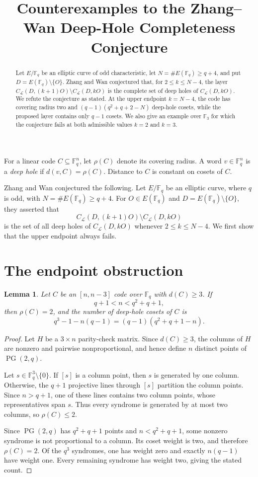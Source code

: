 \documentclass[11pt]{amsart}
\title[Counterexamples to the Zhang--Wan conjecture]
{Counterexamples to the Zhang--Wan Deep-Hole Completeness Conjecture}
\date{}
\newtheorem{lemma}[theorem]{Lemma}
\newcommand{\F}{\mathbb{F}}
\newcommand{\CL}{C_{\mathcal L}}
\newcommand{\PG}{\operatorname{PG}}
\begin{document}
\begin{abstract}
Let $E/\F_q$ be an elliptic curve of odd characteristic, let
$N=\#E(\F_q)\ge q+4$, and put $D=E(\F_q)\setminus\{O\}$.
Zhang and Wan conjectured that, for $2\le k\le N-4$, the layer
$\CL(D,(k+1)O)\setminus\CL(D,kO)$ is the complete set of deep holes of
$\CL(D,kO)$. We refute the conjecture as stated. At the upper endpoint
$k=N-4$, the code has covering radius two and
$(q-1)(q^2+q+2-N)$ deep-hole cosets, while the proposed layer contains
only $q-1$ cosets. We also give an example over $\F_3$ for which the
conjecture fails at both admissible values $k=2$ and $k=3$.
\end{abstract}

\maketitle

For a linear code $C\subseteq\F_q^n$, let $\rho(C)$ denote its covering
radius. A word $v\in\F_q^n$ is a \emph{deep hole} if
$d(v,C)=\rho(C)$. Distance to $C$ is constant on cosets of $C$.

Zhang and Wan \cite[Conjecture~1.4]{ZhangWan} conjectured the following.
Let $E/\F_q$ be an elliptic curve, where $q$ is odd, with
$N=\#E(\F_q)\ge q+4$. For $O\in E(\F_q)$ and
$D=E(\F_q)\setminus\{O\}$, they asserted that
\begin{equation}\label{eq:ZW}
  \CL(D,(k+1)O)\setminus\CL(D,kO)
\end{equation}
is the set of all deep holes of $\CL(D,kO)$ whenever
$2\le k\le N-4$. We first show that the upper endpoint always fails.

\section{The endpoint obstruction}

\begin{lemma}\label{lem:codim-three}
Let $C$ be an $[n,n-3]$ code over $\F_q$ with $d(C)\ge3$. If
\[
  q+1<n<q^2+q+1,
\]
then $\rho(C)=2$, and the number of deep-hole cosets of $C$ is
\[
  q^3-1-n(q-1)=(q-1)(q^2+q+1-n).
\]
\end{lemma}

\begin{proof}
Let $H$ be a $3\times n$ parity-check matrix. Since $d(C)\ge3$, the
columns of $H$ are nonzero and pairwise nonproportional, and hence define
$n$ distinct points of $\PG(2,q)$.

Let $s\in\F_q^3\setminus\{0\}$. If $[s]$ is a column point, then $s$ is
generated by one column. Otherwise, the $q+1$ projective lines through
$[s]$ partition the column points. Since $n>q+1$, one of these lines
contains two column points, whose representatives span $s$. Thus every
syndrome is generated by at most two columns, so $\rho(C)\le2$.

Since $\PG(2,q)$ has $q^2+q+1$ points and $n<q^2+q+1$, some nonzero
syndrome is not proportional to a column. Its coset weight is two, and
therefore $\rho(C)=2$. Of the $q^3$ syndromes, one has weight zero and
exactly $n(q-1)$ have weight one. Every remaining syndrome has weight
two, giving the stated count.
\end{proof}
\end{document}
